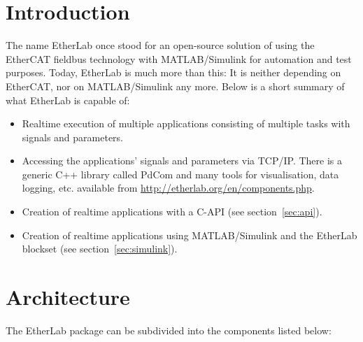 %
%
%


\chapter{Introduction}
\label{sec:intro}

The name EtherLab once stood for an open-source solution of using the EtherCAT
fieldbus technology with MATLAB/Simulink for automation and test purposes.
Today, EtherLab is much more than this: It is neither depending on EtherCAT,
nor on MATLAB/Simulink any more. Below is a short summary of what EtherLab is
capable of:

\begin{itemize}

\item Realtime execution of multiple applications consisting of multiple tasks
with signals and parameters.

\item Accessing the applications' signals and parameters via TCP/IP. There is
a generic C++ library called PdCom and many tools for visualisation, data
logging, etc. available from \url{http://etherlab.org/en/components.php}.

\item Creation of realtime applications with a C-API (see
section~\ref{sec:api}).

\item Creation of realtime applications using MATLAB/Simulink and the EtherLab
blockset (see section~\ref{sec:simulink}).

\end{itemize}


\chapter{Architecture}
\label{sec:arch}

The EtherLab package can be subdivided into the components listed below:

